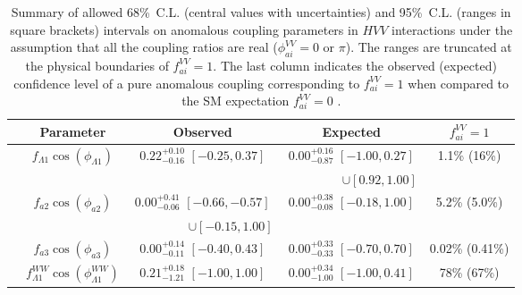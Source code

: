 \begin{table}
\centering
\caption[Summary of allowed 68\%~C.L. (central values with uncertainties) and 95\%~C.L. (ranges in square brackets)
intervals on anomalous coupling parameters in $HVV$ interactions under the assumption that all the coupling
ratios are real ($\phi_{ai}^{VV}=0$ or $\pi$).
The ranges are truncated at the physical boundaries of $f_{ai}^{VV}=1$.
The last column indicates the observed (expected) confidence level of a pure anomalous coupling
corresponding to $f_{ai}^{VV}=1$ when compared to the SM expectation $f_{ai}^{VV}=0$.]{
Summary of allowed 68\%~C.L. (central values with uncertainties) and 95\%~C.L. (ranges in square brackets)
intervals on anomalous coupling parameters in $HVV$ interactions under the assumption that all the coupling
ratios are real ($\phi_{ai}^{VV}=0$ or $\pi$).
The ranges are truncated at the physical boundaries of $f_{ai}^{VV}=1$.
The last column indicates the observed (expected) confidence level of a pure anomalous coupling
corresponding to $f_{ai}^{VV}=1$ when compared to the SM expectation $f_{ai}^{VV}=0$ \cite{Khachatryan:2014kca}.
}
\begin{tabular}{ccccccc}
 & Parameter                                   &  \multicolumn{2}{c}{Observed} &  \multicolumn{2}{c}{Expected}  & $f_{ai}^{VV}=1$  \\
\hline
& $f_{\Lambda1}\cos(\phi_{\Lambda1})$        & \multicolumn{2}{c}{$0.22^{+0.10}_{-0.16}$ $ [-0.25,0.37] $}          & \multicolumn{2}{c}{$0.00^{+0.16}_{-0.87}$ $ [-1.00,0.27]$}
& 1.1\% (16\%)                                    \\
&   & \multicolumn{2}{c}{ }          & \multicolumn{2}{c}{~~~~~~~~~$\cup [0.92,1.00] $}       &            \\
& $f_{a2}\cos(\phi_{a2})$         & \multicolumn{2}{c}{$0.00^{+0.41}_{-0.06}$ $ [-0.66, -0.57]$}     & \multicolumn{2}{c}{$0.00^{+0.38}_{-0.08}$ $ [-0.18,1.00]$}
 & 5.2\% (5.0\%)               \\
 &     & \multicolumn{2}{c}{~~~~~~~~~$ \cup [-0.15,1.00]$}     & \multicolumn{2}{c}{ }       &            \\
& $f_{a3}\cos(\phi_{a3})$         & \multicolumn{2}{c}{$0.00^{+0.14}_{-0.11}$ $ [-0.40,0.43] $} & \multicolumn{2}{c}{$0.00^{+0.33}_{-0.33}$ $ [-0.70,0.70] $}
& 0.02\% (0.41\%)         \\
& $f_{\Lambda1}^{WW}\cos(\phi_{\Lambda1}^{WW})$   & \multicolumn{2}{c}{$0.21^{+0.18}_{-1.21}$ $ [-1.00 ,1.00]$}     & \multicolumn{2}{c}{$0.00^{+0.34}_{-1.00}$ $[-1.00, 0.41]$}
& 78\% (67\%)        \\

\end{tabular}
\end{table}
